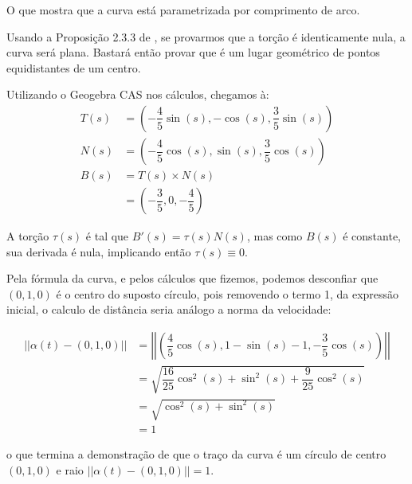 \documentclass[12pt,letterpaper]{article}
\begin{document}
\begin{enumerate}
	O que mostra que a curva está parametrizada por comprimento de arco.
	
	Usando a Proposição 2.3.3 de \cite{pressley2001elementary}, se provarmos que a torção é identicamente nula, a curva será plana. Bastará então provar que é um lugar geométrico de pontos equidistantes de um centro.
	
	Utilizando o Geogebra CAS nos cálculos, chegamos à:
	\begin{align*}
		T(s)&=\left(-\dfrac45\sin(s),-\cos(s),\dfrac35\sin(s)\right)\\
		N(s)&=\left(-\dfrac45\cos(s),\sin(s),\dfrac35\cos(s)\right)\\
		B(s)&=T(s)\times N(s)\\
		&=\left(-\dfrac35,0,-\dfrac{4}{5}\right)
	\end{align*}

	A torção $\tau(s)$ é tal que $B'(s)=\tau(s)N(s)$, mas como $B(s)$ é constante, sua derivada é nula, implicando então $\tau(s)\equiv0$.
	
	Pela fórmula da curva, e pelos cálculos que fizemos, podemos desconfiar que $(0,1,0)$ é o centro do suposto círculo, pois removendo o termo 1, da expressão inicial, o calculo de distância seria análogo a norma da velocidade:
	
	\begin{align*}
		||\alpha(t)-(0,1,0)||&=\left|\left|\left(\dfrac45\cos(s),1-\sin(s)-1,-\dfrac35\cos(s)\right)\right|\right|\\
		&=\sqrt{\dfrac{16}{25}\cos^2(s)+\sin^2(s)+\dfrac{9}{25}\cos^2(s)}\\
		&=\sqrt{\cos^2(s)+\sin^2(s)}\\
		&=1
	\end{align*}

	o que termina a demonstração de que o traço da curva é um círculo de centro $(0,1,0)$ e raio $||\alpha(t)-(0,1,0)||=1$.
	\end{enumerate}

	
	\newpage



\end{document}
